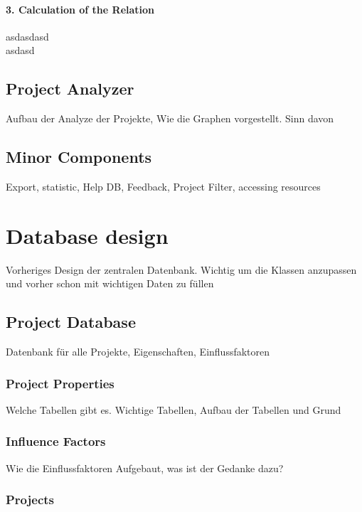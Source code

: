 \paragraph*{3. Calculation of the Relation}
asdasdasd\\
asdasd

\subsection{Project Analyzer}

Aufbau der Analyze der Projekte, Wie die Graphen vorgestellt. Sinn davon

\subsection{Minor Components}

Export, statistic, Help DB, Feedback, Project Filter, accessing resources


\section{Database design}

Vorheriges Design der zentralen Datenbank. Wichtig um die Klassen anzupassen und vorher schon mit wichtigen Daten zu füllen

\subsection{Project Database}

Datenbank für alle Projekte, Eigenschaften, Einflussfaktoren

\subsubsection{Project Properties}

Welche Tabellen gibt es. Wichtige Tabellen, Aufbau der Tabellen und Grund

\subsubsection{Influence Factors}

Wie die Einflussfaktoren Aufgebaut, was ist der Gedanke dazu?

\subsubsection{Projects}

